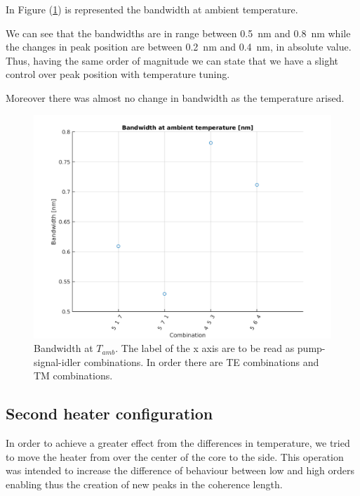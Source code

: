 \documentclass[12pt,a4paper,twoside]{article}
\begin{document}
In Figure (\ref{fig_sym_b@t2}) is represented the bandwidth at ambient temperature.

We can see that the bandwidths are in range between \SI{.5}{\nm} and \SI{.8}{\nm} while the changes in peak position are between \SI{.2}{\nm} and \SI{.4}{\nm}, in absolute value.
Thus, having the same order of magnitude we can state that we have a slight control over peak position with temperature tuning.

Moreover there was almost no change in bandwidth as the temperature arised.
\begin{figure}[hb]
	\centering
	\includegraphics[width=.85\textwidth]{baat2.png}
	\caption{Bandwidth at $T_{amb}$. The label of the x axis are to be read as pump-signal-idler combinations. In order there are TE combinations and TM combinations.}
	\label{fig_sym_b@t2} %
\end{figure}		
		

\clearpage
\subsection{Second heater configuration}
In order to achieve a greater effect from the differences in temperature, we tried to move the heater from over the center of the core to the side.
This operation was intended to increase the difference of behaviour between low and high orders enabling thus the creation of new peaks in the coherence length.
\end{document}
